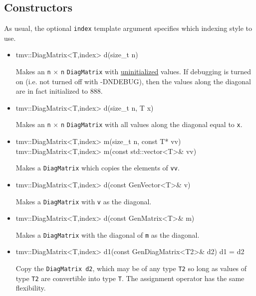 \documentclass[twoside,letterpaper,11pt]{article}
\renewcommand{\tt}[1]{{\lstinline {#1}}}
\begin{document}
\subsection{Constructors}
\label{DiagMatrix_Constructors}

As usual, the optional \tt{index} template argument specifies which indexing
style to use.

\begin{itemize}
\item 
\begin{tmvcode}
tmv::DiagMatrix<T,index> d(size_t n)
\end{tmvcode}
Makes an \tt{n} $\times$ \tt{n} \tt{DiagMatrix} with \underline{uninitialized} values.
If debugging is turned on (i.e. not turned off
with -DNDEBUG), then the values along the diagonal are in fact initialized to 888. 

\item
\begin{tmvcode}
tmv::DiagMatrix<T,index> d(size_t n, T x)
\end{tmvcode}
Makes an \tt{n} $\times$ \tt{n} \tt{DiagMatrix} with all values along the diagonal equal to \tt{x}.

\item
\begin{tmvcode}
tmv::DiagMatrix<T,index> m(size_t n, const T* vv)
tmv::DiagMatrix<T,index> m(const std::vector<T>& vv)
\end{tmvcode}
Makes a \tt{DiagMatrix} which copies the elements of \tt{vv}.

\item
\begin{tmvcode}
tmv::DiagMatrix<T,index> d(const GenVector<T>& v)
\end{tmvcode}
Makes a \tt{DiagMatrix} with \tt{v} as the diagonal.

\item 
\begin{tmvcode}
tmv::DiagMatrix<T,index> d(const GenMatrix<T>& m)
\end{tmvcode}
Makes a \tt{DiagMatrix} with the diagonal of \tt{m} as the diagonal.

\item
\begin{tmvcode}
tmv::DiagMatrix<T,index> d1(const GenDiagMatrix<T2>& d2)
d1 = d2
\end{tmvcode}
Copy the \tt{DiagMatrix d2}, which may be of any type \tt{T2} so long
as values of type \tt{T2} are convertible into type \tt{T}.
The assignment operator has the same flexibility.


\end{itemize}
\end{document}
